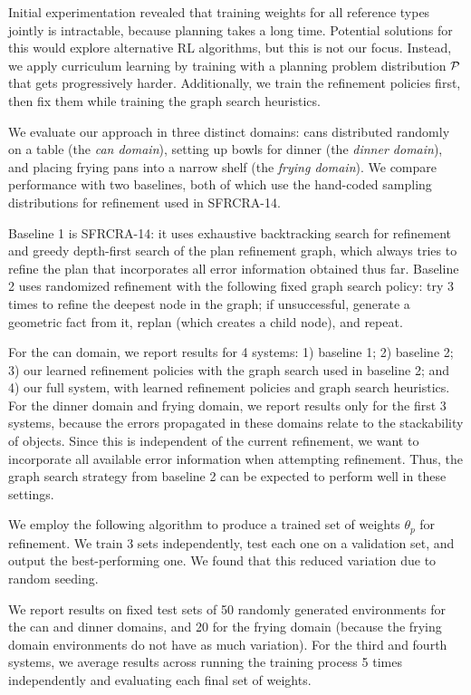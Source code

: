 Initial experimentation revealed that training weights for all reference types jointly is intractable,
because planning takes a long time. Potential solutions for this would explore alternative RL algorithms,
but this is not our focus. Instead, we apply curriculum learning by training with a planning problem distribution
$\mathcal{P}$ that gets progressively harder. Additionally, we train the refinement policies first, then fix them while
training the graph search heuristics.

We evaluate our approach in three distinct domains: cans distributed randomly on a table (the \emph{can domain}),
setting up bowls for dinner (the \emph{dinner domain}), and placing frying pans into a narrow shelf (the \emph{frying domain}).
We compare performance with two baselines, both of which use the hand-coded sampling distributions for
refinement used in SFRCRA-14.

Baseline 1 is SFRCRA-14: it uses exhaustive backtracking search for refinement
and greedy depth-first search of the plan refinement graph, which always tries to refine
the plan that incorporates all error information obtained thus far.
Baseline 2 uses randomized refinement with the following fixed graph search policy: try 3 times to refine the deepest
node in the graph; if unsuccessful, generate a geometric fact from it, replan (which creates a child node), and repeat.

For the can domain, we report results for 4 systems: 1) baseline 1; 2) baseline 2; 3) our learned refinement policies
with the graph search used in baseline 2; and 4) our full system, with learned refinement policies and graph search heuristics.
For the dinner domain and frying domain, we report results only for the first 3 systems, because the errors propagated in these
domains relate to the stackability of objects. Since this is independent of the current refinement, we want to
incorporate all available error information when attempting refinement. Thus, the graph search strategy
from baseline 2 can be expected to perform well in these settings.

We employ the following algorithm to produce a trained set of weights $\theta_{p}$ for refinement. We train 3 sets independently,
test each one on a validation set, and output the best-performing one. We found that this
reduced variation due to random seeding.

We report results on fixed test sets of 50 randomly generated environments for the can and dinner domains,
and 20 for the frying domain (because the frying domain environments do not have as much variation).
For the third and fourth systems, we average results across running the training
process 5 times independently and evaluating each final set of weights.

